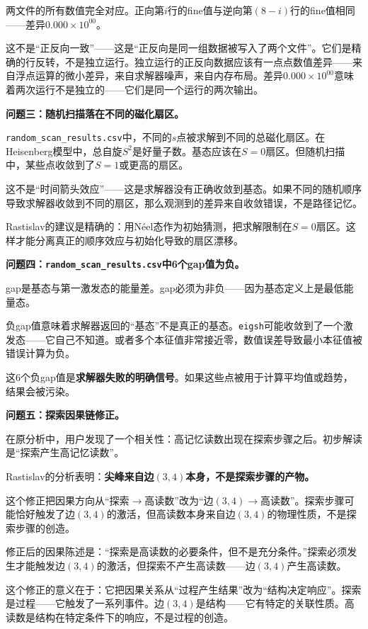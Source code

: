 \documentclass[11pt,a4paper]{book}
\theoremstyle{definition}
\begin{document}
两文件的所有数值完全对应。正向第$i$行的fine值与逆向第$(8-i)$行的fine值相同——差异$0.000\times10^{00}$。

这不是“正反向一致”——这是“正反向是同一组数据被写入了两个文件”。它们是精确的行反转，不是独立运行。独立运行的正反向数据应该有一点点数值差异——来自浮点运算的微小差异，来自求解器噪声，来自内存布局。差异$0.000\times10^{00}$意味着两次运行不是独立的——它们是同一个运行的两次输出。

\textbf{问题三：随机扫描落在不同的磁化扇区。}

\texttt{random\_scan\_results.csv}中，不同的$s$点被求解到不同的总磁化扇区。在Heisenberg模型中，总自旋$S^2$是好量子数。基态应该在$S=0$扇区。但随机扫描中，某些点收敛到了$S=1$或更高的扇区。

这不是“时间箭头效应”——这是求解器没有正确收敛到基态。如果不同的随机顺序导致求解器收敛到不同的扇区，那么观测到的差异来自收敛错误，不是路径记忆。

Rastislav的建议是精确的：用Néel态作为初始猜测，把求解限制在$S=0$扇区。这样才能分离真正的顺序效应与初始化导致的扇区漂移。

\textbf{问题四：\texttt{random\_scan\_results.csv}中6个gap值为负。}

gap是基态与第一激发态的能量差。gap必须为非负——因为基态定义上是最低能量态。

负gap值意味着求解器返回的“基态”不是真正的基态。\texttt{eigsh}可能收敛到了一个激发态——它自己不知道。或者多个本征值非常接近零，数值误差导致最小本征值被错误计算为负。

这6个负gap值是\textbf{求解器失败的明确信号}。如果这些点被用于计算平均值或趋势，结果会被污染。

\textbf{问题五：探索因果链修正。}

在原分析中，用户发现了一个相关性：高记忆读数出现在探索步骤之后。初步解读是“探索产生高记忆读数”。

Rastislav的分析表明：\textbf{尖峰来自边$(3,4)$本身，不是探索步骤的产物。}

这个修正把因果方向从“探索$\to$高读数”改为“边$(3,4)\to$高读数”。探索步骤可能恰好触发了边$(3,4)$的激活，但高读数本身来自边$(3,4)$的物理性质，不是探索步骤的创造。

修正后的因果陈述是：“探索是高读数的必要条件，但不是充分条件。”探索必须发生才能触发边$(3,4)$的激活，但探索不产生高读数——边$(3,4)$产生高读数。

这个修正的意义在于：它把因果关系从“过程产生结果”改为“结构决定响应”。探索是过程——它触发了一系列事件。边$(3,4)$是结构——它有特定的关联性质。高读数是结构在特定条件下的响应，不是过程的创造。
\end{document}
